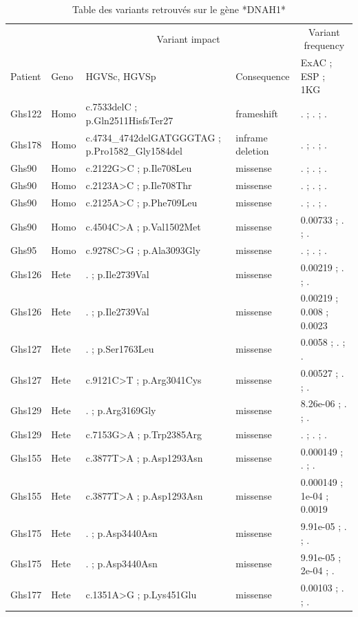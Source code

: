 \documentclass[12pt,twoside]{reedthesis}
\theoremstyle{definition}
\theoremstyle{definition}
\theoremstyle{remark}
\begin{document}
  \begin{landscape}
  \begin{longtable}[t]{lllll}
  \caption{\label{tab:tabdnah1}Table des variants retrouvés sur le gène *DNAH1*}\\
  \toprule
  \multicolumn{2}{c}{ } & \multicolumn{2}{c}{Variant impact} & \multicolumn{1}{c}{Variant frequency} \\
  \cmidrule(l{2pt}r{2pt}){3-4} \cmidrule(l{2pt}r{2pt}){5-5}
  Patient & Geno & HGVSc, HGVSp & Consequence & ExAC ; ESP ; 1KG\\
  \midrule
  Ghs122 & Homo & c.7533delC ; p.Gln2511HisfsTer27 & frameshift & . ; . ; .\\
  Ghs178 & Homo & c.4734\_4742delGATGGGTAG ; p.Pro1582\_Gly1584del & inframe deletion & . ; . ; .\\
  Ghs90 & Homo & c.2122G>C ; p.Ile708Leu & missense & . ; . ; .\\
  Ghs90 & Homo & c.2123A>C ; p.Ile708Thr & missense & . ; . ; .\\
  Ghs90 & Homo & c.2125A>C ; p.Phe709Leu & missense & . ; . ; .\\
  \addlinespace
  Ghs90 & Homo & c.4504C>A ; p.Val1502Met & missense & 0.00733 ; . ; .\\
  Ghs95 & Homo & c.9278C>G ; p.Ala3093Gly & missense & . ; . ; .\\
  Ghs126 & Hete & . ; p.Ile2739Val & missense & 0.00219 ; . ; .\\
  Ghs126 & Hete & . ; p.Ile2739Val & missense & 0.00219 ; 0.008 ; 0.0023\\
  Ghs127 & Hete & . ; p.Ser1763Leu & missense & 0.0058 ; . ; .\\
  \addlinespace
  Ghs127 & Hete & c.9121C>T ; p.Arg3041Cys & missense & 0.00527 ; . ; .\\
  Ghs129 & Hete & . ; p.Arg3169Gly & missense & 8.26e-06 ; . ; .\\
  Ghs129 & Hete & c.7153G>A ; p.Trp2385Arg & missense & . ; . ; .\\
  Ghs155 & Hete & c.3877T>A ; p.Asp1293Asn & missense & 0.000149 ; . ; .\\
  Ghs155 & Hete & c.3877T>A ; p.Asp1293Asn & missense & 0.000149 ; 1e-04 ; 0.0019\\
  \addlinespace
  Ghs175 & Hete & . ; p.Asp3440Asn & missense & 9.91e-05 ; . ; .\\
  Ghs175 & Hete & . ; p.Asp3440Asn & missense & 9.91e-05 ; 2e-04 ; .\\
  Ghs177 & Hete & c.1351A>G ; p.Lys451Glu & missense & 0.00103 ; . ; .\\

\end{longtable}
\end{landscape}
\end{document}
